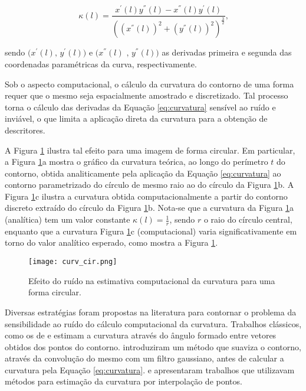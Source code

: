 \begin{equation} \label{eq:curvatura}
\kappa(l) = \frac{x^{'}(l)y^{''}(l)-x^{''}(l)y^{'}(l)}{((x^{''}(l))^{2}+(y^{''}(l))^{2})^{\frac{3}{2}}}\text{,}
\end{equation}

\noindent 
sendo $\big(x^{'}(l) \text{, }y^{'}(l)\big)$ e $\big(x^{''}(l)\text{ , }y^{''}(l)\big)$ as derivadas primeira e segunda das coordenadas paramétricas da curva, respectivamente.

Sob o aspecto computacional, o cálculo da curvatura do contorno de uma forma requer que o mesmo seja espacialmente amostrado e discretizado. Tal processo torna o cálculo das derivadas da Equação \ref{eq:curvatura} sensível ao ruído e inviável, o que limita a aplicação direta da curvatura para a obtenção de descritores. 

A Figura \ref{fig:cir1} ilustra tal efeito para uma imagem de forma circular. Em particular, a  Figura \ref{fig:cir1}a mostra o gráfico da curvatura teórica, ao longo do perímetro $t$ do contorno, obtida analiticamente pela aplicação da Equação \ref{eq:curvatura} ao contorno parametrizado do círculo de mesmo raio ao do círculo da Figura \ref{fig:cir1}b. A Figura \ref{fig:cir1}c ilustra a curvatura obtida computacionalmente a partir do contorno discreto extraído do círculo da Figura \ref{fig:cir1}b. Nota-se que a curvatura da Figura \ref{fig:cir1}a (analítica) tem um valor constante $\kappa(l) = \frac{1}{r}$, sendo $r$ o raio do círculo central, enquanto que a curvatura Figura \ref{fig:cir1}c (computacional) varia significativamente em torno do valor analítico esperado, como mostra a Figura \ref{fig:cir1}. 

\begin{figure}[h!]
  \caption{\label{fig:cir1} Efeito do ruído na estimativa computacional da curvatura para uma forma circular.}
  \centering
  \texttt{[image: curv\_cir.png]}
\end{figure}

Diversas estratégias foram propostas na literatura para contornar o problema da sensibilidade ao ruído do cálculo computacional da curvatura. Trabalhos clássicos, como os de  e  estimam a curvatura através do ângulo formado entre vetores obtidos dos pontos do contorno.  introduziram um método que suaviza o contorno, através da convolução do mesmo com um filtro gaussiano, antes de calcular a curvatura pela Equação \ref{eq:curvatura}.  e  apresentaram trabalhos que utilizavam métodos para estimação da curvatura por interpolação de pontos. 

